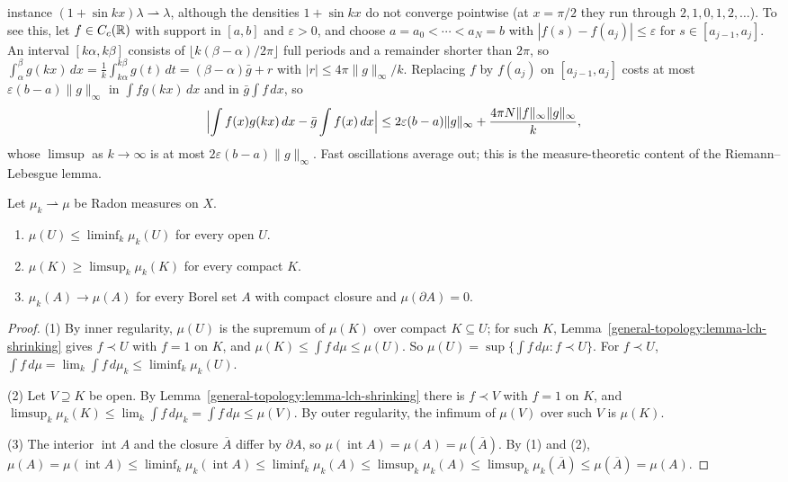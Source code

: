\begin{example}
\begin{enumerate}
instance $(1 + \sin kx)\lambda \rightharpoonup \lambda$, although the densities $1 + \sin kx$ do not converge pointwise (at $x = \pi/2$ they run through $2, 1, 0, 1, 2, \ldots$). To see this, let
$f \in C_c(\mathbb{R})$ with support in $[a, b]$ and $\varepsilon > 0$, and choose $a = a_0 < \cdots < a_N = b$ with $|f(s) - f(a_j)| \leq \varepsilon$ for $s \in [a_{j-1}, a_j]$. An interval
$[k\alpha, k\beta]$ consists of $\lfloor k(\beta - \alpha)/2\pi\rfloor$ full periods and a remainder shorter than $2\pi$, so
$\int_\alpha^\beta g(kx)\,dx = \frac1k\int_{k\alpha}^{k\beta}g(t)\,dt = (\beta - \alpha)\bar g + r$ with $|r| \leq 4\pi\|g\|_\infty/k$. Replacing $f$ by $f(a_j)$ on $[a_{j-1}, a_j]$ costs at most
$\varepsilon(b - a)\|g\|_\infty$ in $\int fg(kx)\,dx$ and in $\bar g\int f\,dx$, so
\[
\Bigl|\int f(x)g(kx)\,dx - \bar g\int f(x)\,dx\Bigr| \leq 2\varepsilon(b - a)\|g\|_\infty + \frac{4\pi N\|f\|_\infty\|g\|_\infty}{k},
\]
whose $\limsup$ as $k \to \infty$ is at most $2\varepsilon(b - a)\|g\|_\infty$. Fast oscillations average out; this is the measure-theoretic content of the Riemann--Lebesgue lemma.
\end{enumerate}
\end{example}

\begin{proposition}\label{measure-theory:proposition-weak-convergence-sets}
Let $\mu_k \rightharpoonup \mu$ be Radon measures on $X$.
\begin{enumerate}
\item $\mu(U) \leq \liminf_k\mu_k(U)$ for every open $U$.
\item $\mu(K) \geq \limsup_k\mu_k(K)$ for every compact $K$.
\item $\mu_k(A) \to \mu(A)$ for every Borel set $A$ with compact closure and $\mu(\partial A) = 0$.
\end{enumerate}
\end{proposition}

\begin{proof}
(1) By inner regularity, $\mu(U)$ is the supremum of $\mu(K)$ over compact $K \subseteq U$; for such $K$, Lemma~\ref{general-topology:lemma-lch-shrinking} gives $f \prec U$ with $f = 1$ on $K$, and
$\mu(K) \leq \int f\,d\mu \leq \mu(U)$. So $\mu(U) = \sup\{\int f\,d\mu : f \prec U\}$. For $f \prec U$, $\int f\,d\mu = \lim_k\int f\,d\mu_k \leq \liminf_k\mu_k(U)$.

(2) Let $V \supseteq K$ be open. By Lemma~\ref{general-topology:lemma-lch-shrinking} there is $f \prec V$ with $f = 1$ on $K$, and $\limsup_k\mu_k(K) \leq \lim_k\int f\,d\mu_k = \int f\,d\mu \leq \mu(V)$.
By outer regularity, the infimum of $\mu(V)$ over such $V$ is $\mu(K)$.

(3) The interior $\operatorname{int}A$ and the closure $\overline{A}$ differ by $\partial A$, so $\mu(\operatorname{int}A) = \mu(A) = \mu(\overline{A})$. By (1) and (2),
$\mu(A) = \mu(\operatorname{int}A) \leq \liminf_k\mu_k(\operatorname{int}A) \leq \liminf_k\mu_k(A) \leq \limsup_k\mu_k(A) \leq \limsup_k\mu_k(\overline{A}) \leq \mu(\overline{A}) = \mu(A)$.
\end{proof}

